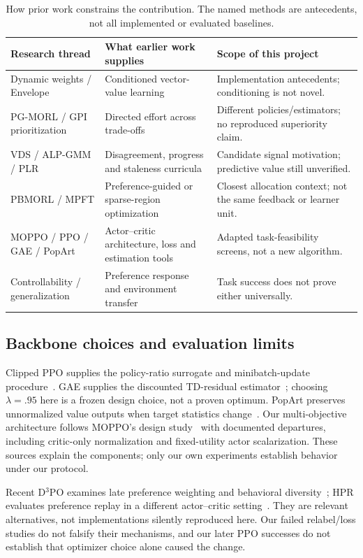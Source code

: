 \begin{table}[htbp]
\centering\small
\begin{tabular}{p{}p{}p{}}
\toprule
Research thread & What earlier work supplies & Scope of this project\\
\midrule
Dynamic weights / Envelope & Conditioned vector-value learning & Implementation antecedents; conditioning is not novel.\\
PG-MORL / GPI prioritization & Directed effort across trade-offs & Different policies/estimators; no reproduced superiority claim.\\
VDS / ALP-GMM / PLR & Disagreement, progress and staleness curricula & Candidate signal motivation; predictive value still unverified.\\
PBMORL / MPFT & Preference-guided or sparse-region optimization & Closest allocation context; not the same feedback or learner unit.\\
MOPPO / PPO / GAE / PopArt & Actor--critic architecture, loss and estimation tools & Adapted task-feasibility screens, not a new algorithm.\\
Controllability / generalization & Preference response and environment transfer & Task success does not prove either universally.\\
\bottomrule
\end{tabular}
\caption{How prior work constrains the contribution. The named methods are
antecedents, not all implemented or evaluated baselines.}
\end{table}

\subsection{Backbone choices and evaluation limits}
Clipped PPO supplies the policy-ratio surrogate and minibatch-update
procedure~\cite{schulman2017ppo}. GAE supplies the discounted TD-residual
estimator~\cite{schulman2015gae}; choosing $\lambda=.95$ here is a frozen design
choice, not a proven optimum. PopArt preserves unnormalized value outputs when
target statistics change~\cite{vanhasselt2016popart}. Our multi-objective
architecture follows MOPPO's design study~\cite{terekhov2024architectures} with
documented departures, including critic-only normalization and fixed-utility
actor scalarization. These sources explain the components; only our own
experiments establish behavior under our protocol.

Recent D$^3$PO examines late preference weighting and behavioral
diversity~\cite{ambadkar2026d3po}; HPR evaluates preference replay in a different
actor--critic setting~\cite{shianifar2026hpr}. They are relevant alternatives,
not implementations silently reproduced here. Our failed relabel/loss studies
do not falsify their mechanisms, and our later PPO successes do not establish
that optimizer choice alone caused the change.

